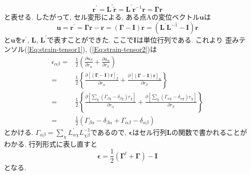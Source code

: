 \begin{equation}
  \bm{r}^{\prime}
  =
  \bm{L}^{\prime} \tilde{\bm{r}}
  =
  \bm{L}^{\prime} \bm{r}^{-1} \bm{r}
  =
  \bm{\Gamma} \bm{r}
\end{equation}
と表せる.
したがって, セル変形による, ある点Aの変位ベクトル$\bm{u}$は
\begin{equation}
  \bm{u}
  =
  \bm{r}^{\prime}
  =
  \bm{\Gamma} \bm{r} - \bm{r}
  =
  (\bm{\Gamma} - \bm{I}) \bm{r}
  =
  (\bm{L}^{\prime} \bm{L}^{-1} - \bm{I}) \bm{r}
\end{equation}
と$\bm{u}$を$\bm{r}^{\prime}$, $\bm{L}$, $\bm{L}^{\prime}$で表すことができた.
ここで$\bm{I}$は単位行列である.
これより 歪みテンソル(\ref{Eq:strain-tensor1}), (\ref{Eq:strain-tensor2})は
\begin{align}
  \epsilon_{\alpha \beta}
  =&
  \frac{1}{2}
  \left(
    \frac{\partial u_{\beta}}{\partial r_{\alpha}} +
    \frac{\partial u_{\alpha}}{\partial r_{\beta}}
  \right)
  \\
  =&
  \frac{1}{2}
  \left\{
    \frac{\partial [(\bm{\Gamma} - \bm{I})\bm{r}]_{\beta}}
         {\partial r_{\alpha}}
    +
    \frac{\partial [(\bm{\Gamma} - \bm{I})\bm{r}]_{\alpha}}
         {\partial r_{\beta}}
  \right\}
  \\
  =&
  \frac{1}{2}
  \left\{
    \frac{\partial [\sum_{\chi}(\Gamma_{\beta\chi} - \delta_{\beta \chi})r_{\chi}]}{\partial r_{\alpha}}
    +
    \frac{\partial [\sum_{\chi}(\Gamma_{\alpha\chi} - \delta_{\alpha\chi})r_{\chi}]}{\partial r_{\beta}}
  \right\}
  \\
  =&
  \frac{1}{2}
  \left(
      \Gamma_{\beta\alpha} - \delta_{\beta\alpha}
      +
      \Gamma_{\alpha\beta} - \delta_{\alpha\beta}
  \right)
\end{align}
とかける.
$\Gamma_{\alpha\beta} = \sum_{\chi} L_{\alpha\chi}^{\prime} L_{\chi\beta}^{-1}$であるので, $\bm{\epsilon}$はセル行列$\bm{L}$の関数で書かれることがわかる.
行列形式に表し直すと
\begin{equation}
  \bm{\epsilon}
  =
  \frac{1}{2}
  \left( \bm{\Gamma}^{t} + \bm{\Gamma} \right) - \bm{I}
  \label{Eq:tensor-epsilon}
\end{equation}
となる.
